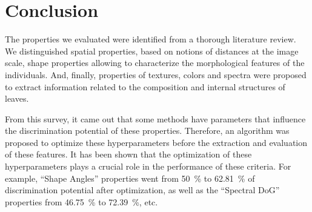 \documentclass[../thesis.tex]{subfiles}
\begin{document}
    
    \newpage
    \section{Conclusion}
    
    
    
    The properties we evaluated were identified from a thorough literature review. We distinguished spatial properties, based on notions of distances at the image scale, shape properties allowing to characterize the morphological features of the individuals. And, finally, properties of textures, colors and spectra were proposed to extract information related to the composition and internal structures of leaves.
    
    From this survey, it came out that some methods have parameters that influence the discrimination potential of these properties. Therefore, an algorithm was proposed to optimize these hyperparameters before the extraction and evaluation of these features. It has been shown that the optimization of these hyperparameters plays a crucial role in the performance of these criteria. For example, ``Shape Angles'' properties went from \SI{50}{\percent} to \SI{62.81}{\percent} of discrimination potential after optimization, as well as the ``Spectral DoG'' properties from \SI{46.75}{\percent} to \SI{72.39}{\percent}, etc.
    
\end{document}
